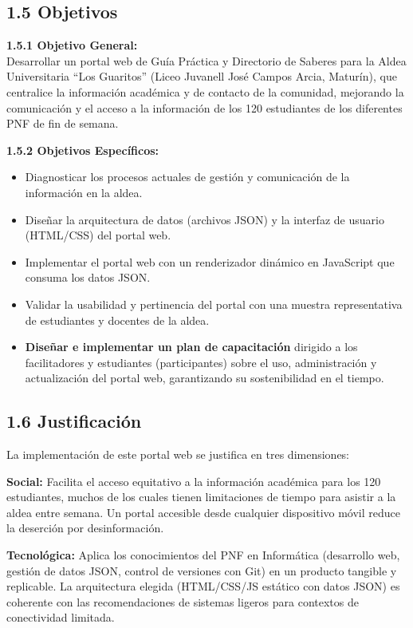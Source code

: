\documentclass[12pt, letterpaper]{article}
\begin{document}
	\subsection*{1.5 Objetivos}
	
	\textbf{1.5.1 Objetivo General:}\\
		Desarrollar un portal web de Guía Práctica y Directorio de Saberes para la Aldea Universitaria “Los Guaritos” (Liceo Juvanell José Campos Arcia, Maturín), que centralice la información académica y de contacto de la comunidad, mejorando la comunicación y el acceso a la información de los 120 estudiantes de los diferentes PNF de fin de semana.

	\textbf{1.5.2 Objetivos Específicos:}
	\begin{itemize}
		\item Diagnosticar los procesos actuales de gestión y comunicación de la información en la aldea.
		\item Diseñar la arquitectura de datos (archivos JSON) y la interfaz de usuario (HTML/CSS) del portal web.
		\item Implementar el portal web con un renderizador dinámico en JavaScript que consuma los datos JSON.
		\item Validar la usabilidad y pertinencia del portal con una muestra representativa de estudiantes y docentes de la aldea.
		\item \textbf{Diseñar e implementar un plan de capacitación} dirigido a los facilitadores y estudiantes (participantes) sobre el uso, administración y actualización del portal web, garantizando su sostenibilidad en el tiempo.
	\end{itemize}
	
	\subsection*{1.6 Justificación}
	
	La implementación de este portal web se justifica en tres dimensiones:
	
	\textbf{Social:} Facilita el acceso equitativo a la información académica para los 120 estudiantes, muchos de los cuales tienen limitaciones de tiempo para asistir a la aldea entre semana. Un portal accesible desde cualquier dispositivo móvil reduce la deserción por desinformación.
	
	\textbf{Tecnológica:} Aplica los conocimientos del PNF en Informática (desarrollo web, gestión de datos JSON, control de versiones con Git) en un producto tangible y replicable. La arquitectura elegida (HTML/CSS/JS estático con datos JSON) es coherente con las recomendaciones de sistemas ligeros para contextos de conectividad limitada.
	
\end{document}
